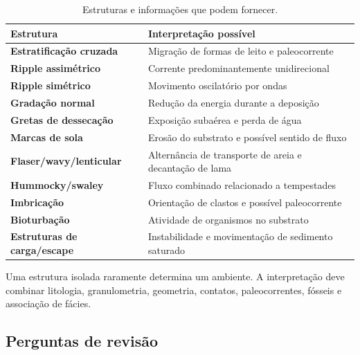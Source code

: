 \begin{table}[H]
  \centering
  \caption{Estruturas e informações que podem fornecer.}
  \begin{tabularx}{\textwidth}{>{\bfseries}lX}
    \toprule
    Estrutura & Interpretação possível \\
    \midrule
    Estratificação cruzada & Migração de formas de leito e paleocorrente \\
    Ripple assimétrico & Corrente predominantemente unidirecional \\
    Ripple simétrico & Movimento oscilatório por ondas \\
    Gradação normal & Redução da energia durante a deposição \\
    Gretas de dessecação & Exposição subaérea e perda de água \\
    Marcas de sola & Erosão do substrato e possível sentido de fluxo \\
    Flaser/wavy/lenticular & Alternância de transporte de areia e decantação de lama \\
    Hummocky/swaley & Fluxo combinado relacionado a tempestades \\
    Imbricação & Orientação de clastos e possível paleocorrente \\
    Bioturbação & Atividade de organismos no substrato \\
    Estruturas de carga/escape & Instabilidade e movimentação de sedimento saturado \\
    \bottomrule
  \end{tabularx}
\end{table}

Uma estrutura isolada raramente determina um ambiente. A interpretação deve combinar
litologia, granulometria, geometria, contatos, paleocorrentes, fósseis e associação de
fácies.

\subsection{Perguntas de revisão}

